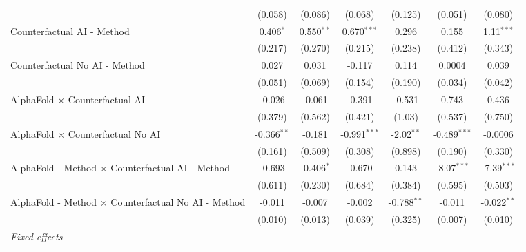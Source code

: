 \begin{tabular}{lcccccc}
                                                              & (0.058)       & (0.086)      & (0.068)        & (0.125)       & (0.051)        & (0.080)\\   
   Counterfactual AI - Method                                 & 0.406$^{*}$   & 0.550$^{**}$ & 0.670$^{***}$  & 0.296         & 0.155          & 1.11$^{***}$\\   
                                                              & (0.217)       & (0.270)      & (0.215)        & (0.238)       & (0.412)        & (0.343)\\   
   Counterfactual No AI - Method                              & 0.027         & 0.031        & -0.117         & 0.114         & 0.0004         & 0.039\\   
                                                              & (0.051)       & (0.069)      & (0.154)        & (0.190)       & (0.034)        & (0.042)\\   
   AlphaFold $\times$ Counterfactual AI                       & -0.026        & -0.061       & -0.391         & -0.531        & 0.743          & 0.436\\   
                                                              & (0.379)       & (0.562)      & (0.421)        & (1.03)        & (0.537)        & (0.750)\\   
   AlphaFold $\times$ Counterfactual No AI                    & -0.366$^{**}$ & -0.181       & -0.991$^{***}$ & -2.02$^{**}$  & -0.489$^{***}$ & -0.0006\\   
                                                              & (0.161)       & (0.509)      & (0.308)        & (0.898)       & (0.190)        & (0.330)\\   
   AlphaFold - Method $\times$ Counterfactual AI - Method     & -0.693        & -0.406$^{*}$ & -0.670         & 0.143         & -8.07$^{***}$  & -7.39$^{***}$\\   
                                                              & (0.611)       & (0.230)      & (0.684)        & (0.384)       & (0.595)        & (0.503)\\   
   AlphaFold - Method $\times$ Counterfactual No AI - Method  & -0.011        & -0.007       & -0.002         & -0.788$^{**}$ & -0.011         & -0.022$^{**}$\\   
                                                              & (0.010)       & (0.013)      & (0.039)        & (0.325)       & (0.007)        & (0.010)\\   
   \midrule
   \emph{Fixed-effects}\\

\end{tabular}
